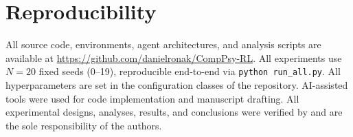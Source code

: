 \documentclass[conference]{IEEEtran}
\begin{document}
\section*{Reproducibility}
All source code, environments, agent architectures, and analysis scripts are available at \url{https://github.com/danielronak/CompPsy-RL}. All experiments use $N=20$ fixed seeds (0--19), reproducible end-to-end via \texttt{python run\_all.py}. All hyperparameters are set in the configuration classes of the repository. AI-assisted tools were used for code implementation and manuscript drafting. All experimental designs, analyses, results, and conclusions were verified by and are the sole responsibility of the authors.

{\footnotesize
\setlength{\bibsep}{2pt}


}
\end{document}

